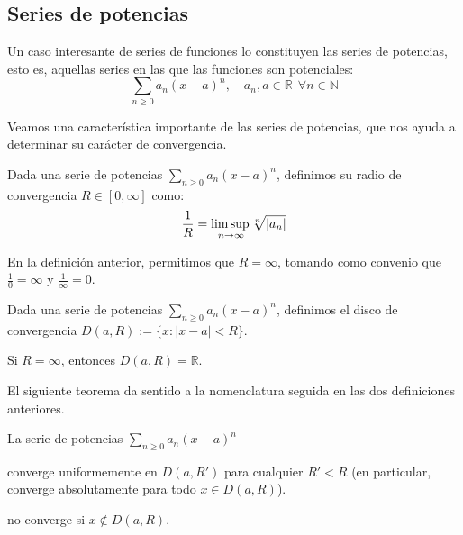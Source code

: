 \subsection{Series de potencias}

Un caso interesante de series de funciones lo constituyen las series de potencias, esto es, aquellas series en las que las funciones son potenciales: $$\sum_{n \ge 0} a_n(x-a)^n, \quad a_n, a \in \mathbb{R} \ \ \forall n \in \mathbb{N}$$

Veamos una característica importante de las series de potencias, que nos ayuda a determinar su carácter de convergencia.

\begin{ndef} Dada una serie de potencias $\sum_{n \ge 0} a_n(x-a)^n$, definimos su radio de convergencia $R \in [0, \infty]$ como: $$
  \frac{1}{R} =\underset{n\to\infty}{\mbox{lim\,sup\,}}  \sqrt[n]{|a_n|}$$
\end{ndef}

\begin{nota}
  En la definición anterior, permitimos que $R = \infty$, tomando como convenio que $\frac{1}{0} = \infty$ y $\frac{1}{\infty} = 0$.
\end{nota}

\begin{ndef} Dada una serie de potencias $\sum_{n \ge 0} a_n(x-a)^n$, definimos el disco de convergencia $D(a,R) := \{ x : |x-a| < R\}$.
\end{ndef}

\begin{nota}
  Si $R = \infty$, entonces $D(a,R) = \mathbb{R}$.
\end{nota}

El siguiente teorema da sentido a la nomenclatura seguida en las dos definiciones anteriores.

\begin{nth} \label{13}
  La serie de potencias $\displaystyle\sum_{n\geq 0} a_n (x-a)^n$
  \begin{nlist}
  \item converge uniformemente en $D(a,R')$ para cualquier $R'<R$ (en particular, converge absolutamente para todo $x\in D(a,R)$).
  \item no converge si $x\not\in \overline{D(a,R)}$.
  \end{nlist}
\end{nth}

